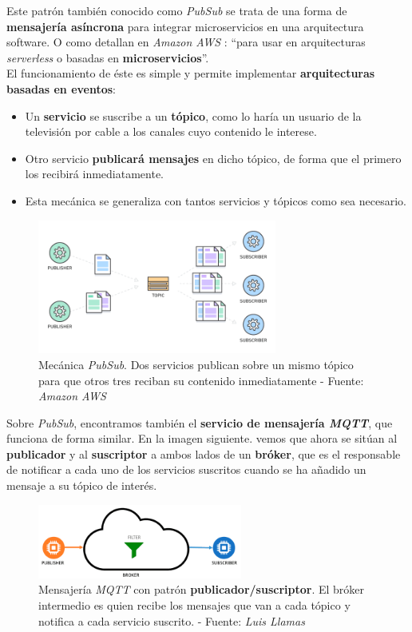 Este patrón también conocido como \textit{PubSub} se trata de una forma de \textbf{mensajería asíncrona} para integrar microservicios en una arquitectura software. O como detallan en \textit{Amazon AWS} \cite{whats-pubsub}: ``para usar en arquitecturas \textit{serverless} o basadas en \textbf{microservicios}''.\\

El funcionamiento de éste es simple y permite implementar \textbf{arquitecturas basadas en eventos}:

\begin{itemize}
	\item Un \textbf{servicio} se suscribe a un \textbf{tópico}, como lo haría un usuario de la televisión por cable a los canales cuyo contenido le interese.
	\item Otro servicio \textbf{publicará mensajes} en dicho tópico, de forma que el primero los recibirá inmediatamente.
	\item Esta mecánica se generaliza con tantos servicios y tópicos como sea necesario.
\end{itemize}

\begin{figure}[h]
	\centering
	\includegraphics[width=0.7\textwidth]{imagenes/pubsub.png}
	\caption{Mecánica \textit{PubSub}. Dos servicios publican sobre un mismo tópico para que otros tres reciban su contenido inmediatamente - Fuente: \textit{Amazon AWS} \cite{whats-pubsub}}
\end{figure}

Sobre \textit{PubSub}, encontramos también el \textbf{servicio de mensajería \textit{MQTT}}, que funciona de forma similar. En la imagen siguiente. vemos que ahora se sitúan al \textbf{publicador} y al \textbf{suscriptor} a ambos lados de un \textbf{bróker}, que es el responsable de notificar a cada uno de los servicios suscritos cuando se ha añadido un mensaje a su tópico de interés.\\

\begin{figure}[h]
	\centering
	\includegraphics[width=0.6\textwidth]{imagenes/protocolos-iot-pubsub.png}
	\caption{Mensajería \textit{MQTT} con patrón \textbf{publicador/suscriptor}. El bróker intermedio es quien recibe los mensajes que van a cada tópico y notifica a cada servicio suscrito. - Fuente: \textit{Luis Llamas} \cite{mqtt-pubsub}}
\end{figure}

